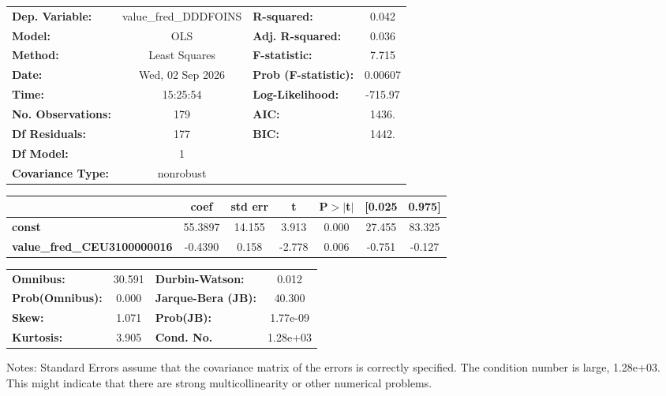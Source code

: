\begin{center}
\begin{tabular}{lclc}
\toprule
\textbf{Dep. Variable:}             & value\_fred\_DDDFOINS & \textbf{  R-squared:         } &     0.042   \\
\textbf{Model:}                     &          OLS          & \textbf{  Adj. R-squared:    } &     0.036   \\
\textbf{Method:}                    &     Least Squares     & \textbf{  F-statistic:       } &     7.715   \\
\textbf{Date:}                      &    Wed, 02 Sep 2026   & \textbf{  Prob (F-statistic):} &  0.00607    \\
\textbf{Time:}                      &        15:25:54       & \textbf{  Log-Likelihood:    } &   -715.97   \\
\textbf{No. Observations:}          &            179        & \textbf{  AIC:               } &     1436.   \\
\textbf{Df Residuals:}              &            177        & \textbf{  BIC:               } &     1442.   \\
\textbf{Df Model:}                  &              1        & \textbf{                     } &             \\
\textbf{Covariance Type:}           &       nonrobust       & \textbf{                     } &             \\
\bottomrule
\end{tabular}
\begin{tabular}{lcccccc}
                                    & \textbf{coef} & \textbf{std err} & \textbf{t} & \textbf{P$> |$t$|$} & \textbf{[0.025} & \textbf{0.975]}  \\
\midrule
\textbf{const}                      &      55.3897  &       14.155     &     3.913  &         0.000        &       27.455    &       83.325     \\
\textbf{value\_fred\_CEU3100000016} &      -0.4390  &        0.158     &    -2.778  &         0.006        &       -0.751    &       -0.127     \\
\bottomrule
\end{tabular}
\begin{tabular}{lclc}
\textbf{Omnibus:}       & 30.591 & \textbf{  Durbin-Watson:     } &    0.012  \\
\textbf{Prob(Omnibus):} &  0.000 & \textbf{  Jarque-Bera (JB):  } &   40.300  \\
\textbf{Skew:}          &  1.071 & \textbf{  Prob(JB):          } & 1.77e-09  \\
\textbf{Kurtosis:}      &  3.905 & \textbf{  Cond. No.          } & 1.28e+03  \\
\bottomrule
\end{tabular}
\end{center}

Notes: \newline
 [1] Standard Errors assume that the covariance matrix of the errors is correctly specified. \newline
 [2] The condition number is large, 1.28e+03. This might indicate that there are \newline
 strong multicollinearity or other numerical problems.